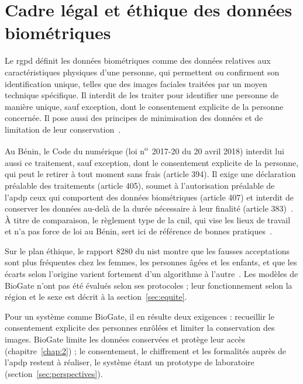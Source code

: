 \section{Cadre légal et éthique des données biométriques}\label{sec:legal}

\begin{nouv}
Le \gls{rgpd} définit les données biométriques comme des données relatives aux caractéristiques physiques d'une personne, qui permettent ou confirment son identification unique, telles que des images faciales traitées par un moyen technique spécifique. Il interdit de les traiter pour identifier une personne de manière unique, sauf exception, dont le consentement explicite de la personne concernée. Il pose aussi des principes de minimisation des données et de limitation de leur conservation~\cite{ue2016rgpd}.

Au Bénin, le Code du numérique (loi n\textsuperscript{o}~2017-20 du 20 avril 2018) interdit lui aussi ce traitement, sauf exception, dont le consentement explicite de la personne, qui peut le retirer à tout moment sans frais (article 394). Il exige une déclaration préalable des traitements (article 405), soumet à l'autorisation préalable de l'\gls{apdp} ceux qui comportent des données biométriques (article 407) et interdit de conserver les données au-delà de la durée nécessaire à leur finalité (article 383)~\cite{apdp2018codenumerique}. À titre de comparaison, le règlement type de la \gls{cnil}, qui vise les lieux de travail et n'a pas force de loi au Bénin, sert ici de référence de bonnes pratiques~\cite{cnil2019reglementtype}.

Sur le plan éthique, le rapport 8280 du \gls{nist} montre que les fausses acceptations sont plus fréquentes chez les femmes, les personnes âgées et les enfants, et que les écarts selon l'origine varient fortement d'un algorithme à l'autre~\cite{grother2019nistir8280}. Les modèles de BioGate n'ont pas été évalués selon ses protocoles ; leur fonctionnement selon la région et le sexe est décrit à la section~\ref{sec:equite}.

Pour un système comme BioGate, il en résulte deux exigences : recueillir le consentement explicite des personnes enrôlées et limiter la conservation des images. BioGate limite les données conservées et protège leur accès (chapitre~\ref{chap:2}) ; le consentement, le chiffrement et les formalités auprès de l'\gls{apdp} restent à réaliser, le système étant un prototype de laboratoire (section~\ref{sec:perspectives}).
\end{nouv}

